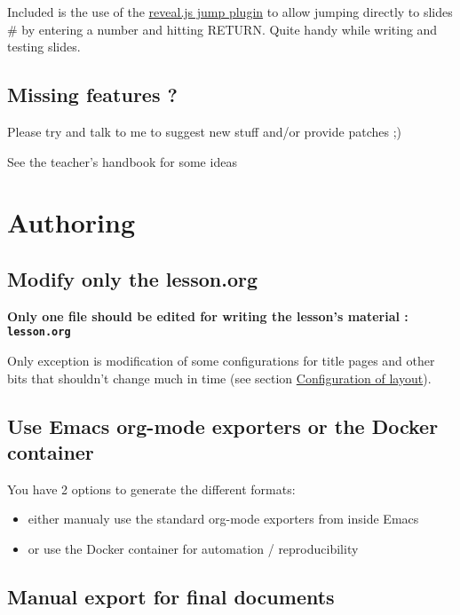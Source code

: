 \documentclass[a4paper]{article}
\begin{document}
Included is the use of the
\href{https://github.com/SethosII/reveal.js-jump-plugin}{reveal.js jump
plugin} to allow jumping directly to slides \# by entering a number
and hitting RETURN. Quite handy while writing and testing slides.

\subsection{Missing features ?}
\label{sec:org932f023}

Please try and talk to me to suggest new stuff and/or provide patches ;)

\begin{NOTES}
See the teacher's handbook for some ideas
\end{NOTES}

\section{Authoring}
\label{sec:org1ca5e4b}
\subsection{Modify only the lesson.org}
\label{sec:org8368acd}

\textbf{Only one file should be edited for writing the lesson's material : \texttt{lesson.org}}

Only exception is modification of some configurations for title pages
and other bits that shouldn't change much in time (see section \hyperref[sec:orga425e8c]{Configuration of layout}).

\subsection{Use Emacs org-mode exporters or the Docker container}
\label{sec:orga2d4da8}

You have 2 options to generate the different formats:
\begin{itemize}
\item either manualy use the standard org-mode exporters from inside Emacs
\item or use the Docker container for automation / reproducibility
\end{itemize}

\subsection{Manual export for final documents}
\label{sec:orgb335182}
\end{document}
